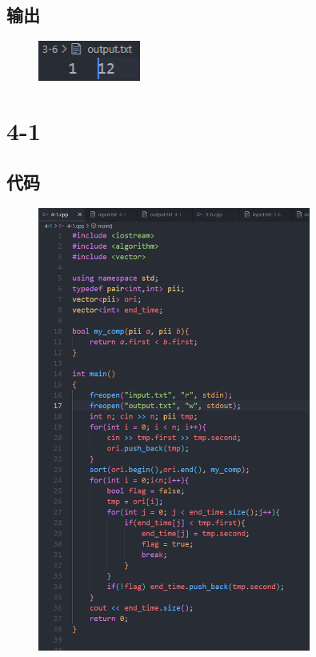 \documentclass[11pt]{article}  %
\begin{document}
\subsection*{输出}

    \begin{figure}[H]
        \centering
        \includegraphics[width = 0.3\textwidth]{pic/3-6out.png}
    \end{figure}

\section*{4-1}

\subsection*{代码}

    \begin{figure}[H]
        \centering
        \includegraphics[width = 0.8\textwidth]{pic/4-1.png}
    \end{figure}
\end{document}

